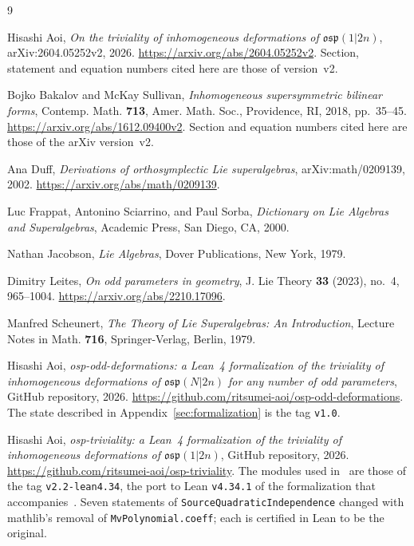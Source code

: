 \documentclass[11pt]{article}
\numberwithin{equation}{section}
\theoremstyle{definition}
\theoremstyle{remark}
\newcommand{\osp}{\mathfrak{osp}}
\begin{document}
\begin{thebibliography}{9}\raggedright
{}
Hisashi Aoi,
\emph{On the triviality of inhomogeneous deformations of $\osp(1|2n)$},
arXiv:2604.05252v2, 2026.
\mbox{\url{https://arxiv.org/abs/2604.05252v2}}.
Section, statement and equation numbers cited here are those of version~v2.

Bojko Bakalov and McKay Sullivan,
\emph{Inhomogeneous supersymmetric bilinear forms},
Contemp. Math. \textbf{713}, Amer. Math. Soc., Providence, RI, 2018, pp.~35--45.
\mbox{\url{https://arxiv.org/abs/1612.09400v2}}.
Section and equation numbers cited here are those of the arXiv version~v2.

Ana Duff,
\emph{Derivations of orthosymplectic Lie superalgebras},
arXiv:math/0209139, 2002.
\mbox{\url{https://arxiv.org/abs/math/0209139}}.

Luc Frappat, Antonino Sciarrino, and Paul Sorba,
\emph{Dictionary on Lie Algebras and Superalgebras},
Academic Press, San Diego, CA, 2000.

Nathan Jacobson,
\emph{Lie Algebras},
Dover Publications, New York, 1979.

Dimitry Leites,
\emph{On odd parameters in geometry},
J. Lie Theory \textbf{33} (2023), no.~4, 965--1004.
\mbox{\url{https://arxiv.org/abs/2210.17096}}.

Manfred Scheunert,
\emph{The Theory of Lie Superalgebras: An Introduction},
Lecture Notes in Math. \textbf{716}, Springer-Verlag, Berlin, 1979.

Hisashi Aoi,
\emph{osp-odd-deformations: a Lean~4 formalization of the triviality of
inhomogeneous deformations of $\mathfrak{osp}(N|2n)$ for any number of odd parameters},
GitHub repository, 2026.
\mbox{\url{https://github.com/ritsumei-aoi/osp-odd-deformations}}.
The state described in Appendix~\ref{sec:formalization} is the tag \texttt{v1.0}.

Hisashi Aoi,
\emph{osp-triviality: a Lean~4 formalization of the triviality of
inhomogeneous deformations of $\mathfrak{osp}(1|2n)$},
GitHub repository, 2026.
\mbox{\url{https://github.com/ritsumei-aoi/osp-triviality}}.
The modules used in~\cite{Dev} are those of the tag \texttt{v2.2-lean4.34}, the port to Lean
\texttt{v4.34.1} of the formalization that accompanies~\cite{Aoi26}. Seven statements of
\texttt{SourceQuadraticIndependence} changed with mathlib's removal of \texttt{MvPolynomial.coeff};
each is certified in Lean to be the original.

\end{thebibliography}
\end{document}
